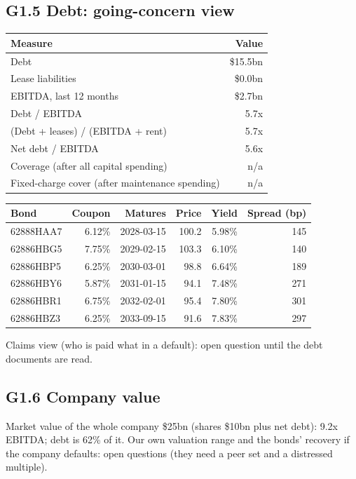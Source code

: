 \documentclass[11pt,a4paper]{article}
\begin{document}
\subsection*{G1.5 Debt: going-concern view}
\begin{center}\footnotesize\setlength{\tabcolsep}{3.5pt}\begin{tabular}{@{}lr@{}}\toprule
Measure & Value \\\midrule
Debt & \$15.5bn \\
Lease liabilities & \$0.0bn \\
EBITDA, last 12 months & \$2.7bn \\
Debt / EBITDA & 5.7x \\
(Debt + leases) / (EBITDA + rent) & 5.7x \\
Net debt / EBITDA & 5.6x \\
Coverage (after all capital spending) & n/a \\
Fixed-charge cover (after maintenance spending) & n/a \\
\bottomrule\end{tabular}\end{center}
\begin{center}\footnotesize\setlength{\tabcolsep}{3.5pt}\begin{tabular}{@{}lrrrrr@{}}\toprule
Bond & Coupon & Matures & Price & Yield & Spread (bp) \\\midrule
62888HAA7 & 6.12\% & 2028-03-15 & 100.2 & 5.98\% & 145 \\
62886HBG5 & 7.75\% & 2029-02-15 & 103.3 & 6.10\% & 140 \\
62886HBP5 & 6.25\% & 2030-03-01 & 98.8 & 6.64\% & 189 \\
62886HBY6 & 5.87\% & 2031-01-15 & 94.1 & 7.48\% & 271 \\
62886HBR1 & 6.75\% & 2032-02-01 & 95.4 & 7.80\% & 301 \\
62886HBZ3 & 6.25\% & 2033-09-15 & 91.6 & 7.83\% & 297 \\
\bottomrule\end{tabular}\end{center}
Claims view (who is paid what in a default): open question until the debt documents are read.
\subsection*{G1.6 Company value}
Market value of the whole company \$25bn (shares \$10bn plus net debt): 9.2x EBITDA; debt is 62\% of it. Our own valuation range and the bonds' recovery if the company defaults: open questions (they need a peer set and a distressed multiple).
\end{document}
